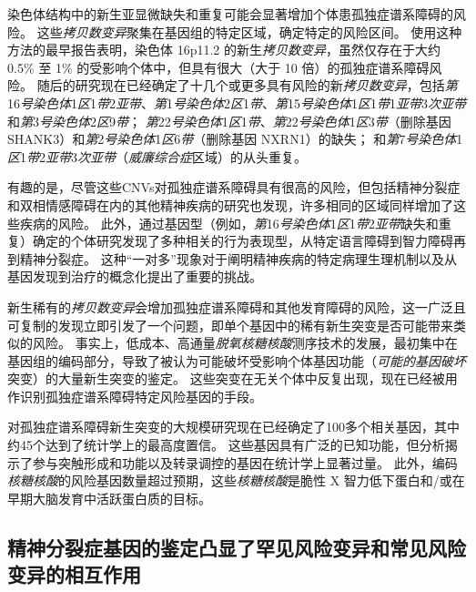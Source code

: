 染色体结构中的新生亚显微缺失和重复可能会显著增加个体患孤独症谱系障碍的风险。
这些\textit{拷贝数变异}聚集在基因组的特定区域，确定特定的风险区间。
使用这种方法的最早报告表明，染色体 16p11.2 的新生\textit{拷贝数变异}，虽然仅存在于大约 0.5\% 至 1\% 的受影响个体中，但具有很大（大于 10 倍）的孤独症谱系障碍风险。
随后的研究现在已经确定了十几个或更多具有风险的新\textit{拷贝数变异}，包括\textit{第}16\textit{号染色体}1\textit{区}1\textit{带}2\textit{亚带}、\textit{第}1\textit{号染色体}2\textit{区}1\textit{带}、\textit{第}15\textit{号染色体}1\textit{区}1\textit{带}1\textit{亚带}3\textit{次亚带}和\textit{第}3\textit{号染色体}2\textit{区}9\textit{带}；
\textit{第}22\textit{号染色体}1\textit{区}1\textit{带}、\textit{第}22\textit{号染色体}1\textit{区}3\textit{带}（删除基因 SHANK3）和\textit{第}2\textit{号染色体}1\textit{区}6\textit{带}（删除基因 NXRN1）的缺失；
和\textit{第}7\textit{号染色体}1\textit{区}1\textit{带}2\textit{亚带}3\textit{次亚带}（\textit{威廉综合症}区域）的从头重复。


有趣的是，尽管这些CNVs对孤独症谱系障碍具有很高的风险，但包括精神分裂症和双相情感障碍在内的其他精神疾病的研究也发现，许多相同的区域同样增加了这些疾病的风险。
此外，通过基因型（例如，\textit{第}16\textit{号染色体}1\textit{区}1\textit{带}2\textit{亚带}缺失和重复）确定的个体研究发现了多种相关的行为表现型，从特定语言障碍到智力障碍再到精神分裂症。
这种“一对多”现象对于阐明精神疾病的特定病理生理机制以及从基因发现到治疗的概念化提出了重要的挑战。


新生稀有的\textit{拷贝数变异}会增加孤独症谱系障碍和其他发育障碍的风险，这一广泛且可复制的发现立即引发了一个问题，即单个基因中的稀有新生突变是否可能带来类似的风险。
事实上，低成本、高通量\textit{脱氧核糖核酸}测序技术的发展，最初集中在基因组的编码部分，导致了被认为可能破坏受影响个体基因功能（\textit{可能的基因破坏}突变）的大量新生突变的鉴定。
这些突变在无关个体中反复出现，现在已经被用作识别孤独症谱系障碍特定风险基因的手段。

对孤独症谱系障碍新生突变的大规模研究现在已经确定了100多个相关基因，其中约45个达到了统计学上的最高度置信。
这些基因具有广泛的已知功能，但分析揭示了参与突触形成和功能以及转录调控的基因在统计学上显著过量。
此外，编码\textit{核糖核酸}的风险基因数量超过预期，这些\textit{核糖核酸}是脆性 X 智力低下蛋白和/或在早期大脑发育中活跃蛋白质的目标。



\subsection{精神分裂症基因的鉴定凸显了罕见风险变异和常见风险变异的相互作用}

